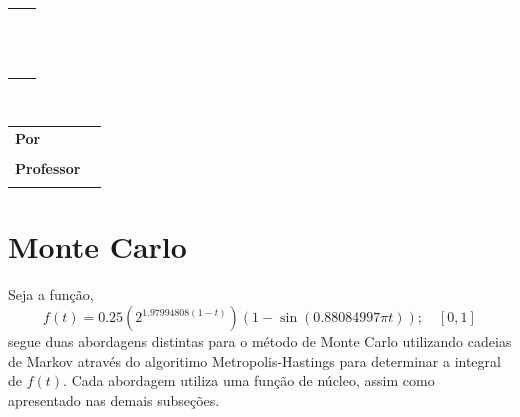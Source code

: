 \documentclass [a4paper,10pt]{article}
\newcommand{\n}[1]{\textbf{#1}}
\begin{document}
  \thispagestyle{fancy}
  \fancyhf{}
  \renewcommand{\footrulewidth}{0.0pt}
  \renewcommand{\headrulewidth}{0.0pt}
  \cfoot{\bfseries \thepage}

  \begin{flushleft}
    \begin{tabular}{ l l }
      \multirow{2}{*}{\rule{0.15\textwidth}{48pt}} & \hspace{-3.5mm}{\large Exercício de Programa 4:}\\[2mm] 
      & \hspace{-3.5mm}{\huge \n{Monte Carlo com Metropolis-Hastings}}\\[-2.85mm]
      & \hspace{-4.5mm}\rule{1.1\textwidth}{1.6pt}
    \end{tabular}
  \end{flushleft}
  \begin{center}
    \vspace{-2.5mm}
    \\[0.5cm]
    \hspace{-5.5cm}\begin{tabular}{ l l }
      \n{Por} & \\[-2mm]
      & \hspace{-10mm}{\small Caio Vinícius Dadauto$\qquad$7994808}\\
      \n{Professor} & \\[-2mm]
      & \hspace{-10mm}{\small Julio Michael Stern}\\[4mm]
    \end{tabular}
  \end{center}
  \vspace{2cm}

  \section{Monte Carlo}
  	Seja a função,
  	\begin{equation}
  		f(t) = 0.25(2^{1.97994808(1-t)})(1 - \sin(0.88084997\pi t));\quad [0, 1]
  	\end{equation}
  	segue duas abordagens distintas para o método de Monte Carlo utilizando cadeias 
  	de Markov através do algoritimo Metropolis-Hastings para determinar a integral de $f(t)$.
  	Cada abordagem utiliza uma função de núcleo, assim como apresentado nas demais subseções.
\end{document}
